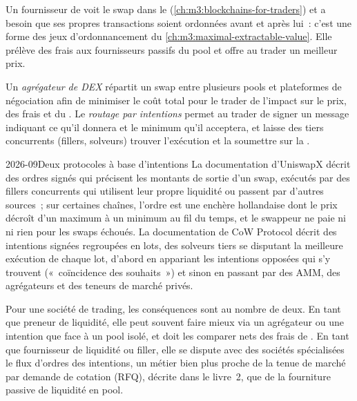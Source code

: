 Un fournisseur de  voit le swap dans le  (\cref{ch:m3:blockchains-for-traders}) et a besoin que ses propres transactions soient ordonnées avant et
après lui~: c'est une forme des jeux d'ordonnancement du \cref{ch:m3:maximal-extractable-value}. Elle prélève des frais aux fournisseurs
passifs du pool et offre au trader un meilleur prix.

\begin{definition}\label{def:m3:automated-market-makers:routing}
Un \emph{agrégateur de DEX} répartit un swap entre plusieurs pools et plateformes de négociation afin de minimiser le coût total pour le trader de l'impact sur le prix,
des frais et du . Le \emph{routage par intentions} permet au trader de signer un message
indiquant ce qu'il donnera et le minimum qu'il acceptera, et laisse des tiers concurrents (fillers, solveurs) trouver l'exécution et la soumettre sur la .
\end{definition}

\begin{dated}{2026-09}{Deux protocoles à base d'intentions}\label{dat:m3:automated-market-makers:intents}
La documentation d'UniswapX décrit des ordres signés qui précisent les montants de sortie d'un swap, exécutés par des fillers concurrents qui utilisent leur propre liquidité ou passent
par d'autres sources~; sur certaines chaînes, l'ordre est une enchère hollandaise dont le prix décroît d'un maximum à un minimum au fil du temps, et le swappeur ne paie
ni  ni rien pour les swaps échoués. La documentation de CoW Protocol décrit des intentions signées regroupées en lots, des solveurs tiers se disputant
la meilleure exécution de chaque lot, d'abord en appariant les intentions opposées qui s'y trouvent («~coïncidence des souhaits~») et sinon en passant par
des AMM, des agrégateurs et des teneurs de marché privés.
\end{dated}

Pour une société de trading, les conséquences sont au nombre de deux. En tant que preneur de liquidité, elle peut souvent faire mieux via un agrégateur ou une intention que face à un pool isolé,
et doit les comparer nets des frais de . En tant que fournisseur de liquidité ou filler, elle se dispute avec des sociétés spécialisées le flux d'ordres des intentions, un métier bien plus proche
de la tenue de marché par demande de cotation (RFQ), décrite dans le livre~2, que de la fourniture passive de liquidité en pool.


